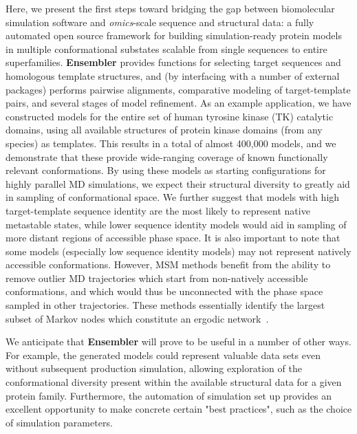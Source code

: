 \documentclass[aps,pre,twocolumn,nofootinbib,superscriptaddress,linenumbers]{revtex4-1}
\begin{document}
Here, we present the first steps toward bridging the gap between biomolecular simulation software and \emph{omics}-scale sequence and structural data: a fully automated open source framework for building simulation-ready protein models in multiple conformational substates scalable from single sequences to entire superfamilies.
{\bf Ensembler} provides functions for selecting target sequences and homologous template structures, and (by interfacing with a number of external packages) performs pairwise alignments, comparative modeling of target-template pairs, and several stages of model refinement.
As an example application, we have constructed models for the entire set of human tyrosine kinase (TK) catalytic domains, using all available structures of protein kinase domains (from any species) as templates.
This results in a total of almost 400,000 models, and we demonstrate that these provide wide-ranging coverage of known functionally relevant conformations.
By using these models as starting configurations for highly parallel MD simulations, we expect their structural diversity to greatly aid in sampling of conformational space.
We further suggest that models with high target-template sequence identity are the most likely to represent native metastable states, while lower sequence identity models would aid in sampling of more distant regions of accessible phase space.
It is also important to note that some models (especially low sequence identity models) may not represent natively accessible conformations.
However, MSM methods benefit from the ability to remove outlier MD trajectories which start from non-natively accessible conformations, and which would thus be unconnected with the phase space sampled in other trajectories.
These methods essentially identify the largest subset of Markov nodes which constitute an ergodic network~\cite{msmbuilder,caflisch:jpcb:2011:msm-subgraph}.

We anticipate that {\bf Ensembler} will prove to be useful in a number of other ways.
For example, the generated models could represent valuable data sets even without subsequent production simulation, allowing exploration of the conformational diversity present within the available structural data for a given protein family.
Furthermore, the automation of simulation set up provides an excellent opportunity to make concrete certain "best practices", such as the choice of simulation parameters.

\end{document}
